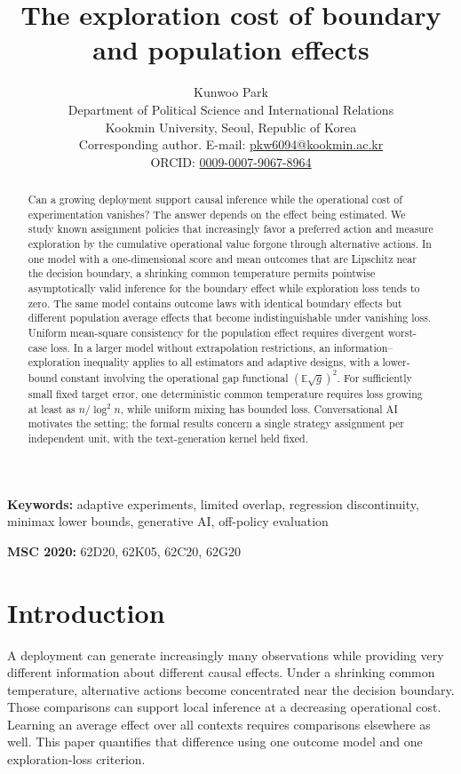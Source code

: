 \documentclass[12pt]{article}
\title{The exploration cost of boundary and population effects}
\author{Kunwoo Park\\[4pt]
\normalsize Department of Political Science and International Relations\\
\normalsize Kookmin University, Seoul, Republic of Korea\\
\normalsize Corresponding author. E-mail:
\href{mailto:pkw6094@kookmin.ac.kr}{pkw6094@kookmin.ac.kr}\\
\normalsize ORCID: \href{https://orcid.org/0009-0007-9067-8964}{0009-0007-9067-8964}}
\date{}
\theoremstyle{definition}
\theoremstyle{remark}
\newcommand{\E}{\mathbb{E}}
\begin{document}
\maketitle

\begin{abstract}
\noindent Can a growing deployment support causal inference while the operational
cost of experimentation vanishes? The answer depends on the effect being
estimated. We study known assignment policies that increasingly favor a
preferred action and measure exploration by the cumulative operational value
forgone through alternative actions. In one model with a one-dimensional
score and mean outcomes that are Lipschitz near the decision boundary, a
shrinking common temperature permits pointwise asymptotically valid inference
for the boundary effect while exploration loss tends to zero. The same model
contains outcome laws with identical boundary effects but different population
average effects that become indistinguishable under vanishing loss. Uniform
mean-square consistency for the population effect requires divergent
worst-case loss. In a larger model without extrapolation restrictions, an
information--exploration inequality applies to all estimators and adaptive
designs, with a lower-bound constant involving the operational gap functional
$(\E\sqrt g)^2$. For sufficiently small fixed target error, one deterministic
common temperature requires loss growing at least as $n/\log^2 n$, while
uniform mixing has bounded loss. Conversational AI motivates the setting;
the formal results concern a single strategy assignment per independent unit,
with the text-generation kernel held fixed.
\end{abstract}

\noindent\textbf{Keywords:} adaptive experiments, limited overlap, regression
discontinuity, minimax lower bounds, generative AI, off-policy evaluation

\noindent\textbf{MSC 2020:} 62D20, 62K05, 62C20, 62G20

\section{Introduction}\label{sec:intro}

A deployment can generate increasingly many observations while providing
very different information about different causal effects. Under a shrinking common temperature, alternative actions become
concentrated near the decision boundary. Those comparisons can support local
inference at a decreasing operational cost. Learning an average effect over
all contexts requires comparisons elsewhere as well. This paper quantifies
that difference using one outcome model and one exploration-loss criterion.
\end{document}
